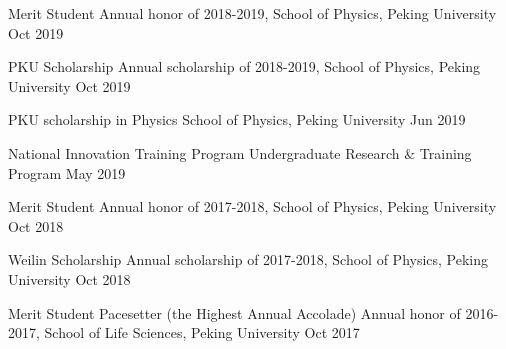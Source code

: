 




\begin{cvhonors}



\cvhonor
{Merit Student} %
{Annual honor of 2018-2019, School of Physics, Peking University} %
{} %
{Oct 2019} %


\cvhonor
{PKU Scholarship} %
{Annual scholarship of 2018-2019, School of Physics, Peking University} %
{} %
{Oct 2019} %

\cvhonor
{PKU scholarship in Physics} %
{School of Physics, Peking University} %
{} %
{Jun 2019} %


\cvhonor
{National Innovation Training Program} %
{Undergraduate Research \& Training Program} %
{} %
{May 2019} %


\cvhonor
{Merit Student} %
{Annual honor of 2017-2018, School of Physics, Peking University} %
{} %
{Oct 2018} %


\cvhonor
{Weilin Scholarship} %
{Annual scholarship of 2017-2018, School of Physics, Peking University} %
{} %
{Oct 2018} %


\cvhonor
{Merit Student Pacesetter (the Highest Annual Accolade)} %
{Annual honor of 2016-2017, School of Life Sciences, Peking University} %
{} %
{Oct 2017} %


\end{cvhonors}
